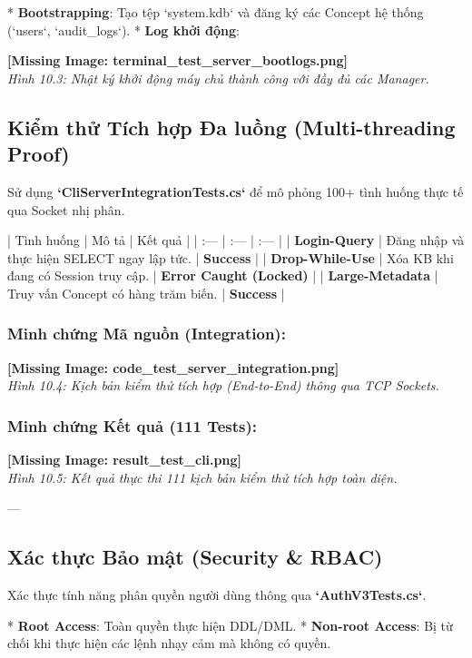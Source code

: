 *   \textbf{Bootstrapping}: Tạo tệp `system.kdb` và đăng ký các Concept hệ thống (`users`, `audit\_logs`).
*   \textbf{Log khởi động}:

\textbf{[Missing Image: terminal_test_server_bootlogs.png]}\\ \textit{Hình 10.3: Nhật ký khởi động máy chủ thành công với đầy đủ các Manager.}

\subsection{Kiểm thử Tích hợp Đa luồng (Multi-threading Proof)}

Sử dụng \textbf{`CliServerIntegrationTests.cs`} để mô phỏng 100+ tình huống thực tế qua Socket nhị phân.

| Tình huống | Mô tả | Kết quả |
| :--- | :--- | :--- |
| \textbf{Login-Query} | Đăng nhập và thực hiện SELECT ngay lập tức. | \textbf{Success} |
| \textbf{Drop-While-Use} | Xóa KB khi đang có Session truy cập. | \textbf{Error Caught (Locked)} |
| \textbf{Large-Metadata} | Truy vấn Concept có hàng trăm biến. | \textbf{Success} |

\subsubsection{Minh chứng Mã nguồn (Integration):}
\textbf{[Missing Image: code_test_server_integration.png]}\\ \textit{Hình 10.4: Kịch bản kiểm thử tích hợp (End-to-End) thông qua TCP Sockets.}

\subsubsection{Minh chứng Kết quả (111 Tests):}
\textbf{[Missing Image: result_test_cli.png]}\\ \textit{Hình 10.5: Kết quả thực thi 111 kịch bản kiểm thử tích hợp toàn diện.}

---

\subsection{Xác thực Bảo mật (Security & RBAC)}

Xác thực tính năng phân quyền người dùng thông qua \textbf{`AuthV3Tests.cs`}. 

*   \textbf{Root Access}: Toàn quyền thực hiện DDL/DML.
*   \textbf{Non-root Access}: Bị từ chối khi thực hiện các lệnh nhạy cảm mà không có quyền.

